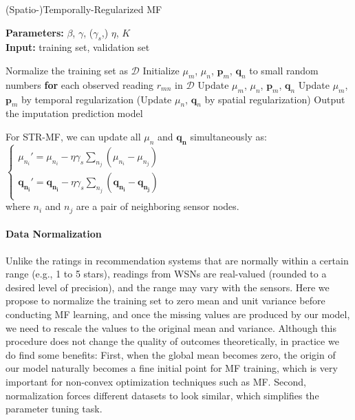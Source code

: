 \begin{algorithm}[thb]
	\caption{(Spatio-)Temporally-Regularized MF}
	\label{alg:STRMF}
	\textbf{Parameters:} $\beta$, $\gamma$, ($\gamma_s$,) $\eta$, $K$\\
	\textbf{Input:} training set, validation set
	\begin{algorithmic}
		\State Normalize the training set as $\mathcal{D}$
		\State Initialize $\mu_m$, $\mu_n$, $\mathbf{p}_m$, $\mathbf{q}_n$ to small random numbers
		\Repeat
			\State \textbf{for} each observed reading $r_{mn}$ in $\mathcal{D}$
				\State \indent Update $\mu_m$, $\mu_n$, $\mathbf{p}_{m}$, $\mathbf{q}_{n}$
			\State Update $\mu_m$, $\mathbf{p}_m$ by temporal regularization
			\State (Update $\mu_n$, $\mathbf{q}_n$ by spatial regularization)
		\State Output the imputation prediction model
	\end{algorithmic}
\end{algorithm}

For STR-MF, we can update all $\mu_n$ and $\mathbf{q_n}$ simultaneously as:\\
\indent $\begin{cases}
	\mu_{n_i}' = \mu_{n_i} - \eta \gamma_s \sum_{n_j}{(\mu_{n_i} - \mu_{n_j})}\\
	\mathbf{q_{n_i}}' = \mathbf{q_{n_i}} - \eta \gamma_s \sum_{n_j}{(\mathbf{q_{n_i}} - \mathbf{q_{n_j}})}\\
	\end{cases}$\\
where $n_i$ and $n_j$ are a pair of neighboring sensor nodes.

\paragraph*{Data Normalization}
Unlike the ratings in recommendation systems that are normally within a certain range (e.g., 1 to 5 stars), readings from WSNs are real-valued (rounded to a desired level of precision), and the range may vary with the sensors.
Here we propose to normalize the training set to zero mean and unit variance before conducting MF learning, and once the missing values are produced by our model, we need to rescale the values to the original mean and variance.
Although this procedure does not change the quality of outcomes theoretically, in practice we do find some benefits: 
First, when the global mean becomes zero, the origin of our model naturally becomes a fine initial point for MF training, which is very important for non-convex optimization techniques such as MF.
Second, normalization forces different datasets to look similar, which simplifies the parameter tuning task. 



